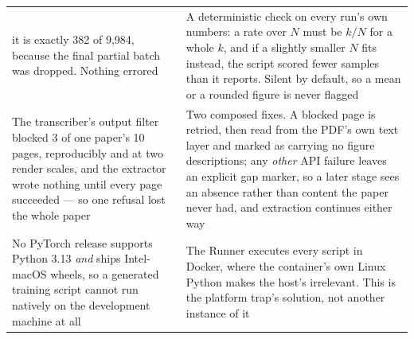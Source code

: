 \documentclass[10pt,twocolumn]{article}
\begin{document}
\begin{table}[tbp]
\begin{tabular}{L{0.47\textwidth}L{0.47\textwidth}}
  it is exactly 382 of 9{,}984, because the final partial batch was dropped. Nothing errored &
  A deterministic check on every run's own numbers: a rate over $N$ must be $k/N$ for a whole
  $k$, and if a slightly smaller $N$ fits instead, the script scored fewer samples than it
  reports. Silent by default, so a mean or a rounded figure is never flagged \\
The transcriber's output filter blocked 3 of one paper's 10 pages, reproducibly and at two render
  scales, and the extractor wrote nothing until every page succeeded --- so one refusal lost the
  whole paper & Two composed fixes. A blocked page is retried, then read from the PDF's own text
  layer and marked as carrying no figure descriptions; any \emph{other} API failure leaves an
  explicit gap marker, so a later stage sees an absence rather than content the paper never had,
  and extraction continues either way \\
No PyTorch release supports Python 3.13 \emph{and} ships Intel-macOS wheels, so a generated
  training script cannot run natively on the development machine at all & The Runner executes
  every script in Docker, where the container's own Linux Python makes the host's irrelevant. This
  is the platform trap's solution, not another instance of it \\
\bottomrule
\end{tabular}
\end{table}
\end{document}
